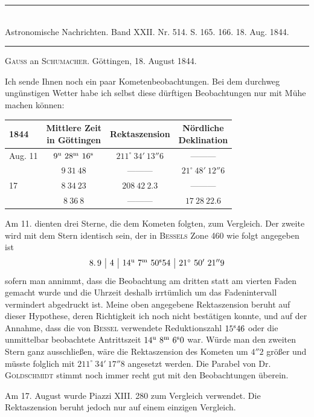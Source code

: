 \clearpage
{}
\hypertarget{native-472-lower}{}
\begin{center}
\rule{0.55\linewidth}{0.4pt}\\[2pt]
Astronomische Nachrichten. Band XXII. Nr. 514. S. 165. 166. 18. Aug. 1844.\\[2pt]
\rule{0.55\linewidth}{0.4pt}
\end{center}
\begin{center}\textsc{Gauss} an \textsc{Schumacher}. Göttingen, 18. August 1844.\end{center}

Ich sende Ihnen noch ein paar Kometenbeobachtungen. Bei dem durchweg ungünstigen Wetter habe ich selbst diese dürftigen Beobachtungen nur mit Mühe machen können:

\begin{center}
\setlength{\tabcolsep}{4pt}
\begin{tabular}{l|c|c|c}
1844 & \shortstack{Mittlere Zeit\\in Göttingen} & Rektaszension & \shortstack{Nördliche\\Deklination} \\\hline
Aug. 11 & $9^{\rm u}\ 28^{\rm m}\ 16^{\rm s}$ & $211^\circ\ 34'\ 13''6$ & ---\quad ---\quad --- \\
 & $9\ 31\ 48$ & ---\quad ---\quad --- & $21^\circ\ 48'\ 12''6$ \\
17 & $8\ 34\ 23$ & $208\ 42\ 2.3$ & ---\quad ---\quad --- \\
 & $8\ 36\ 8$ & ---\quad ---\quad --- & $17\ 28\ 22.6$ \\
\end{tabular}
\end{center}

Am 11. dienten drei Sterne, die dem Kometen folgten, zum Vergleich. Der zweite wird mit dem Stern identisch sein, der in \textsc{Bessels} Zone 460 wie folgt angegeben ist
\[
\begin{array}{c|c|c|c}
8.\,9 & 4 & 14^{\rm u}\ 7^{\rm m}\ 50^{\rm s}54 & 21^\circ\ 50'\ 21''9
\end{array}
\]
\noindent sofern man annimmt, dass die Beobachtung am dritten statt am vierten Faden gemacht wurde und die Uhrzeit deshalb irrtümlich um das Fadenintervall vermindert abgedruckt ist. Meine oben angegebene Rektaszension beruht auf dieser Hypothese, deren Richtigkeit ich noch nicht bestätigen konnte, und auf der Annahme, dass die von \textsc{Bessel} verwendete Reduktionszahl $15^{\rm s}46$ oder die unmittelbar beobachtete Antrittszeit $14^{\rm u}\ 8^{\rm m}\ 6^{\rm s}0$ war. Würde man den zweiten Stern ganz ausschließen, wäre die Rektaszension des Kometen um $4''2$ größer und müsste folglich mit $211^\circ\ 34'\ 17''8$ angesetzt werden. Die Parabel von Dr. \textsc{Goldschmidt} stimmt noch immer recht gut mit den Beobachtungen überein.

Am 17. August wurde Piazzi XIII. 280 zum Vergleich verwendet. Die Rektaszension beruht jedoch nur auf einem einzigen Vergleich.

